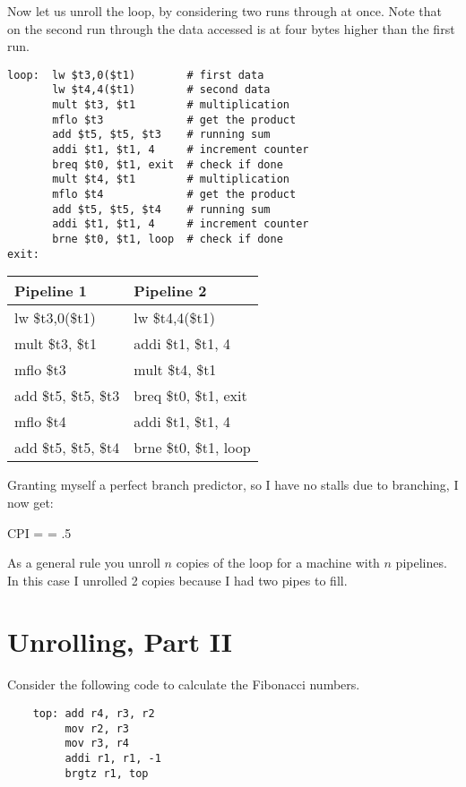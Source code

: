 Now let us unroll the loop, by considering two runs through at once.  Note that on the second run through the data accessed is at four bytes higher than the first run.

\begin{verbatim}
loop:  lw $t3,0($t1)        # first data
       lw $t4,4($t1)        # second data
       mult $t3, $t1        # multiplication
       mflo $t3             # get the product
       add $t5, $t5, $t3    # running sum
       addi $t1, $t1, 4     # increment counter
       breq $t0, $t1, exit  # check if done
       mult $t4, $t1        # multiplication
       mflo $t4             # get the product
       add $t5, $t5, $t4    # running sum
       addi $t1, $t1, 4     # increment counter
       brne $t0, $t1, loop  # check if done
exit:
\end{verbatim}

\vspace{3pt}
\begin{tabular}{l|l}
  Pipeline 1 & Pipeline 2 \\
  \hline
  lw \$t3,0(\$t1)       & lw \$t4,4(\$t1) \\
  mult \$t3, \$t1       & addi \$t1, \$t1, 4 \\
  mflo \$t3             & mult \$t4, \$t1 \\
  add \$t5, \$t5, \$t3  & breq \$t0, \$t1, exit \\
  mflo \$t4             & addi \$t1, \$t1, 4 \\
  add \$t5, \$t5, \$t4  & brne \$t0, \$t1, loop \\
\end{tabular}
\vspace{3pt}

Granting myself a perfect branch predictor, so I have no stalls due to branching, I now get:

\beqn
CPI = = .5
\eeqn

As a general rule you unroll $n$ copies of the loop for a machine with $n$ pipelines.  In this case I unrolled 2 copies because I had two pipes to fill.

\section{Unrolling, Part II}

Consider the following code to calculate the Fibonacci numbers.

\begin{verbatim}
    top: add r4, r3, r2
         mov r2, r3
         mov r3, r4
         addi r1, r1, -1
         brgtz r1, top
\end{verbatim}

